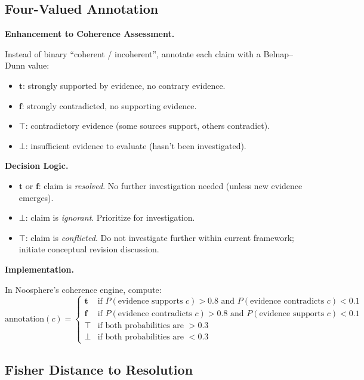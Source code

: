 \documentclass[11pt,letterpaper]{article}
\theoremstyle{definition}
\theoremstyle{remark}
\begin{document}
\subsection{Four-Valued Annotation}

\textbf{Enhancement to Coherence Assessment.}

Instead of binary ``coherent / incoherent'', annotate each claim with a Belnap--Dunn value:
\begin{itemize}
\item $\mathbf{t}$: strongly supported by evidence, no contrary evidence.
\item $\mathbf{f}$: strongly contradicted, no supporting evidence.
\item $\top$: contradictory evidence (some sources support, others contradict).
\item $\bot$: insufficient evidence to evaluate (hasn't been investigated).
\end{itemize}

\textbf{Decision Logic.}
\begin{itemize}
\item $\mathbf{t}$ or $\mathbf{f}$: claim is \emph{resolved}. No further investigation needed (unless new evidence emerges).
\item $\bot$: claim is \emph{ignorant}. Prioritize for investigation.
\item $\top$: claim is \emph{conflicted}. Do not investigate further within current framework; initiate conceptual revision discussion.
\end{itemize}

\textbf{Implementation.}

In Noosphere's coherence engine, compute:
\[
\text{annotation}(c) = \begin{cases}
\mathbf{t} & \text{if } P(\text{evidence supports } c) > 0.8 \text{ and } P(\text{evidence contradicts } c) < 0.1 \\
\mathbf{f} & \text{if } P(\text{evidence contradicts } c) > 0.8 \text{ and } P(\text{evidence supports } c) < 0.1 \\
\top & \text{if both probabilities are $> 0.3$} \\
\bot & \text{if both probabilities are $< 0.3$}
\end{cases}
\]

\subsection{Fisher Distance to Resolution}
\end{document}
